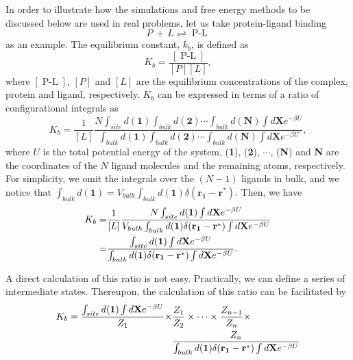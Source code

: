 In order to illustrate how the simulations and free energy methods to be discussed below are used in real problems, let us take protein-ligand binding
\begin{equation}
P\,+\,L\rightleftharpoons \operatorname{P-L}
\end{equation}
as an example. The equilibrium constant, $k_b$, is defined as
\begin{equation}
K_b=\frac{[\operatorname{P-L}]}{[P][L]},
\end{equation} 
where $[\operatorname{P-L}]$, $[P]$ and $[L]$ are the equilibrium concentrations of the complex, protein and ligand, respectively. $K_b$ can be expressed in terms of a ratio of configurational integrals as
\begin{equation}
K_b=\frac{1}{[L]}\frac{N\int_{site}d(\mathbf{1})\int_{bulk}d(\mathbf{2})\cdots\int_{bulk}d(\mathbf{N})\int d\mathbf{X}e^{-\beta U}}{\int_{bulk}d(\mathbf{1})\int_{bulk}d(\mathbf{2})\cdots\int_{bulk}d(\mathbf{N})\int d\mathbf{X}e^{-\beta U}},
\end{equation}
where $U$ is the total potential energy of the system, (\textbf{1}), (\textbf{2}), $\cdots$, (\textbf{N}) and \textbf{N} are the coordinates of the $N$ ligand molecules and the remaining atoms, respectively. For simplicity, we omit the integrals over the $(N-1)$ ligands in bulk, and we notice that $\int_{bulk}d(\mathbf{1})=V_{bulk}\int_{bulk}d(\mathbf{1})\delta(\mathbf{r_1}-\mathbf{r}^*)$. Then, we have
\begin{align}
   K_b=&\frac{1}{[L]}\frac{N\int_{site}d(\mathbf{1})\int d\mathbf{X}e^{-\beta U}}{V_{bulk}\int_{bulk}d(\mathbf{1})\delta(\mathbf{r_1}-\mathbf{r}^*)\int d\mathbf{X}e^{-\beta U}}\notag\\
      =&\frac{\int_{site}d(\mathbf{1})\int d\mathbf{X}e^{-\beta U}}{\int_{bulk}d(\mathbf{1})\delta(\mathbf{r_1}-\mathbf{r}^*)\int d\mathbf{X}e^{-\beta U}}.
\end{align}

A direct calculation of this ratio is not easy. Practically, we can define a series of intermediate states. Thereupon, the calculation of this ratio can be facilitated by
\begin{align}
K_b=\frac{\int_{site}d(\mathbf{1})\int d\mathbf{X}e^{-\beta U}}{Z_1}\times&\frac{Z_1}{Z_2}\times\cdots\times\frac{Z_{n-1}}{Z_n}\times\notag\\ &\frac{Z_n}{\int_{bulk}d(\mathbf{1})\delta(\mathbf{r_1}-\mathbf{r}^*)\int d\mathbf{X}e^{-\beta U}}
\label{Eq:Intro:K_b_path}
\end{align}

